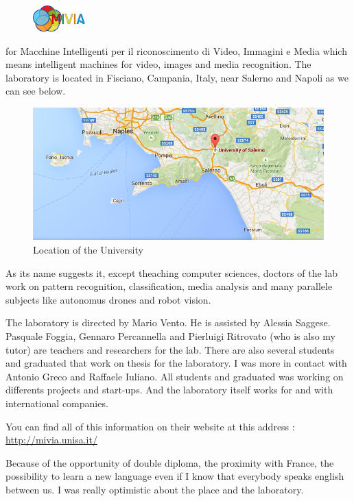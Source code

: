 \documentclass[english,a4paper,11pt]{report}
\begin{document}
	
	
	
	
	\tableofcontents
	\newpage
	
	\setcounter{page}{1}
	
	
	
	
	
	
	\begin{figure}
	\vspace{-7mm}
	\includegraphics[width=2cm]{images_not_compressed/MIVIALogo.jpg}
	\end{figure}
 for Macchine Intelligenti per il riconoscimento di Video, Immagini e Media which means intelligent machines for video, images and media recognition. The laboratory is located in Fisciano, Campania, Italy, near Salerno and Napoli as we can see below.
 \begin{figure}[h]
 \begin{center}
	 \includegraphics[width=12cm]{images_not_compressed/geoUniversity.png}
		\caption{Location of the University}
	 \end{center}
 \end{figure}
 \par As its name suggests it, except theaching computer sciences, doctors of the lab work on pattern recognition, classification, media analysis and many parallele subjects like autonomus drones and robot vision.
 \par The laboratory is directed by Mario Vento. He is assisted by Alessia Saggese. Pasquale Foggia, Gennaro Percannella and Pierluigi Ritrovato (who is also my tutor) are teachers and researchers for the lab. There are also several students and graduated that work on thesis for the laboratory. I was more in contact with Antonio Greco and Raffaele Iuliano. All students and graduated was working on differents projects and start-ups. And the laboratory itself works for and with international companies.
 \par You can find all of this information on their website at this address : \url{http://mivia.unisa.it/}
 \par Because of the opportunity of double diploma, the proximity with France, the possibility to learn a new language even if I know that everybody speaks english between us. I was really optimistic about the place and the laboratory.
	 
\end{document}
